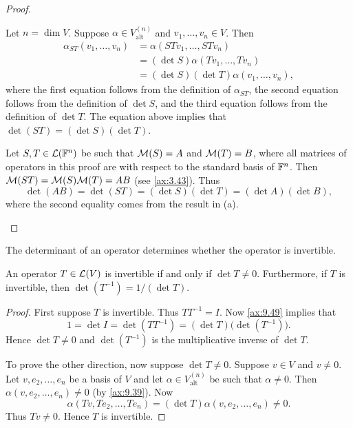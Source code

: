 \begin{proof}\leavevmode
\begin{parts}
\item Let $n=\dim V$. Suppose $\alpha\in V_{\mathrm{alt}}^{(n)}$ and
  $v_1,\dots,v_n\in V$. Then
  \begin{align*}
  \alpha_{ST}(v_1,\dots,v_n) &= \alpha(STv_1,\dots,STv_n)\\
    &= (\det S)\alpha(Tv_1,\dots,Tv_n)\\
    &= (\det S)(\det T)\alpha(v_1,\dots,v_n),
  \end{align*}
  where the first equation follows from the definition of $\alpha_{ST}$, the
  second equation follows from the definition of $\det S$, and the third
  equation follows from the definition of $\det T$. The equation above implies
  that $\det(ST)=(\det S)(\det T)$.
\item Let $S,T\in\mathcal{L}(\mathbb{F}^n)$ be such that $\mathcal{M}(S)=A$ and $\mathcal{M}(T)=B$, where
  all matrices of operators in this proof are with respect to the standard
  basis of $\mathbb{F}^n$. Then $\mathcal{M}(ST)=\mathcal{M}(S)\mathcal{M}(T)=AB$ (see \ref{ax:3.43}). Thus
  \[ \det(AB) = \det(ST) = (\det S)(\det T) = (\det A)(\det B), \]
  where the second equality comes from the result in (a). \qedhere
\end{parts}
\end{proof}

The determinant of an operator determines whether the operator is invertible.

\begin{result}\label{ax:9.50}
An operator $T\in\mathcal{L}(V)$ is invertible if and only if $\det T\ne0$.
Furthermore, if $T$ is invertible, then $\det(T^{-1})=1/(\det T)$.
\end{result}

\begin{proof}
First suppose $T$ is invertible. Thus $TT^{-1}=I$. Now \ref{ax:9.49} implies
that
\[ 1 = \det I = \det(TT^{-1}) = (\det T)\bigl(\det(T^{-1})\bigr). \]
Hence $\det T\ne0$ and $\det(T^{-1})$ is the multiplicative inverse of
$\det T$.

To prove the other direction, now suppose $\det T\ne0$. Suppose $v\in V$ and
$v\ne0$. Let $v,e_2,\dots,e_n$ be a basis of $V$ and let
$\alpha\in V_{\mathrm{alt}}^{(n)}$ be such that $\alpha\ne0$. Then
$\alpha(v,e_2,\dots,e_n)\ne0$ (by \ref{ax:9.39}). Now
\[ \alpha(Tv,Te_2,\dots,Te_n) = (\det T)\alpha(v,e_2,\dots,e_n) \ne 0. \]
Thus $Tv\ne0$. Hence $T$ is invertible.
\end{proof}

